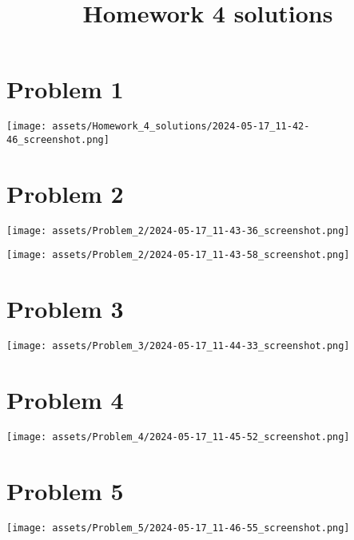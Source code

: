 \documentclass{amsart}
\date{}
\title{Homework 4 solutions}
\begin{document}
\maketitle
\section{Problem 1}
\label{sec:org4a22daa}
\begin{center}
\texttt{[image: assets/Homework\_4\_solutions/2024-05-17\_11-42-46\_screenshot.png]}
\end{center}
\section{Problem 2}
\label{sec:org5486e83}

\begin{center}
\texttt{[image: assets/Problem\_2/2024-05-17\_11-43-36\_screenshot.png]}
\end{center}

\begin{center}
\texttt{[image: assets/Problem\_2/2024-05-17\_11-43-58\_screenshot.png]}
\end{center}
\section{Problem 3}
\label{sec:orgd42f169}
\begin{center}
\texttt{[image: assets/Problem\_3/2024-05-17\_11-44-33\_screenshot.png]}
\end{center}
\section{Problem 4}
\label{sec:orgecc3009}

\begin{center}
\texttt{[image: assets/Problem\_4/2024-05-17\_11-45-52\_screenshot.png]}
\end{center}
\section{Problem 5}
\label{sec:orgc315010}

\begin{center}
\texttt{[image: assets/Problem\_5/2024-05-17\_11-46-55\_screenshot.png]}
\end{center}
\end{document}
